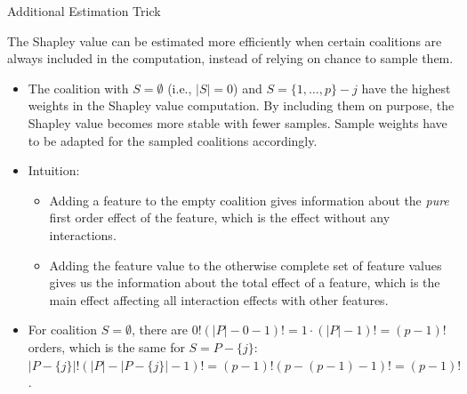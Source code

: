 \documentclass[aspectratio=169]{../latex_main/tntbeamer}  %
\begin{document}
\begin{frame}{Additional Estimation Trick}

  \vspace{-1em}
  The Shapley value can be estimated more efficiently when certain coalitions are always included in the computation, instead of relying on chance to sample them.
  \begin{itemize}
    \item The coalition with $S = \emptyset$ (i.e., $|S| = 0$) and $S = \{1, \ldots, p\} - j$ have the highest weights in the Shapley value computation. By including them on purpose, the Shapley value becomes more stable with fewer samples. Sample weights have to be adapted for the sampled coalitions accordingly.
    \pause
    \item Intuition: 
    \begin{itemize}
        \item Adding a feature to the empty coalition gives information about the \textit{pure} first order effect of the feature, which is the effect without any interactions.
        \item Adding the feature value to the otherwise complete set of feature values gives us the information about the total effect of a feature, which is the main effect affecting all interaction effects with other features.
    \end{itemize} 
    \item For coalition $S = \emptyset$, there are $0! (|P| - 0 - 1)! = 1 \cdot (|P| - 1)! = (p - 1)!$ orders, which is the same for $S = P - \{j\}$: $|P - \{j\}|! (|P| - |P - \{j\}| - 1)! = (p - 1)! (p - (p-1) - 1)! = (p-1)!$.
    \end{itemize}
\end{frame}

\end{document}
